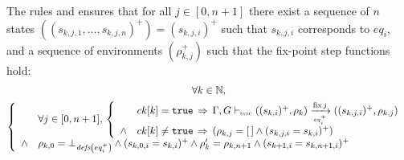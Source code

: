 \begin{skippableproof}
    The rules  and  ensures that for all $j \in [0, n+1]$ there exist a sequence of $n$
    states $((s_{k,j,1}, \dots, s_{k,j,n})^+) = (s_{k,j,i})^+$ such that $s_{k,j,i}$ corresponds to
    $eq_i$, and a sequence of environments $(\rho_{k,j}^{+})$ such that the fix-point step functions
    hold:
    \begin{multline*}
        \forall k \in \N, \\
        \left\{
        \begin{array}{ll}
                   & \forall j \in [0, n+1], \,
            \left\{
            \begin{array}{ll}
                       & ck[k] = \true \, \Rightarrow \,
                \fixsem{j}{\rho_k}{(s_{k, i})^+}{eq_i^+}{(s_{k,j,i})^+}{\rho_{k,j}} \\
                \wedge & ck[k] \neq \true \, \Rightarrow \,
                (\rho_{k,j} = \emptyrho \wedge (s_{k,j,i} = s_{k, i})^+)            \\
            \end{array}
            \right.                                                                             \\
            \wedge & \rho_{k,0} = \botrho{\defs{eq_i^+}} \wedge (s_{k,0,i} = s_{k, i})^+ \wedge
            \rho'_k = \rho_{k,n+1} \wedge (s_{k+1, i} = s_{k,n+1,i})^+                          \\
        \end{array}
        \right.
    \end{multline*}


\end{skippableproof}
